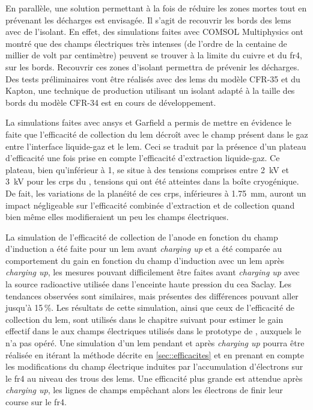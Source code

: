     En parallèle, une solution permettant à la fois de réduire les zones mortes tout en prévenant les décharges est envisagée. Il s'agit de recouvrir les bords des \glspl{lem} avec de l'isolant. En effet, des simulations faites avec COMSOL Multiphysics ont montré que des champs électriques très intenses (de l'ordre de la centaine de millier de volt par centimètre) peuvent se trouver à la limite du cuivre et du \gls{fr4}, sur les bords. Recouvrir ces zones d'isolant permettra de prévenir les décharges. Des tests préliminaires vont être réalisés avec des \glspl{lem} du modèle CFR-35 et du Kapton, une technique de production utilisant un isolant adapté à la taille des bords du modèle CFR-34 est en cours de développement.

    La simulations faites avec \gls{ansys} et Garfield a permis de mettre en évidence le faite que l'efficacité de collection du \gls{lem} décroît avec le champ présent dans le gaz entre l'interface liquide-gaz et le \gls{lem}. Ceci se traduit par la présence d'un plateau d'efficacité une fois prise en compte l'efficacité d'extraction liquide-gaz. Ce plateau, bien qu'inférieur à 1, se situe à des tensions comprises entre \SI{2}{\kilo\volt} et \SI{3}{\kilo\volt} pour les \glspl{crp} du \SSS{}, tensions qui ont été atteintes dans la boîte cryogénique. De fait, les variations de la planéité de ces \glspl{crp}, inférieures à \SI{1.75}{\milli\meter}, auront un impact négligeable sur l'efficacité combinée d'extraction et de collection quand bien même elles modifieraient un peu les champs électriques.

    La simulation de l'efficacité de collection de l'anode en fonction du champ d'induction a été faite pour un \gls{lem} avant \textit{charging up} et a été comparée au comportement du gain en fonction du champ d'induction avec un \gls{lem} après \textit{charging up}, les mesures pouvant difficilement être faites avant \textit{charging up} avec la source radioactive utilisée dans l'enceinte haute pression du \gls{cea} Saclay. Les tendances observées sont similaires, mais présentes des différences pouvant aller jusqu'à 15\,\%. Les résultats de cette simulation, ainsi que ceux de l'efficacité de collection du \gls{lem}, sont utilisés dans le chapitre suivant pour estimer le gain effectif dans le \TOO{} aux champs électriques utilisés dans le prototype de \threeL{}, auxquels le \TOO{} n'a pas opéré. Une simulation d'un \gls{lem} pendant et après \textit{charging up} pourra être réalisée en itérant la méthode décrite en \autoref{sec::efficacites} et en prenant en compte les modifications du champ électrique induites par l'accumulation d'électrons sur le \gls{fr4} au niveau des trous des \glspl{lem}. Une efficacité plus grande est attendue après \textit{charging up}, les lignes de champs empêchant alors les électrons de finir leur course sur le \gls{fr4}.

\FloatBarrier

\printbibliography
